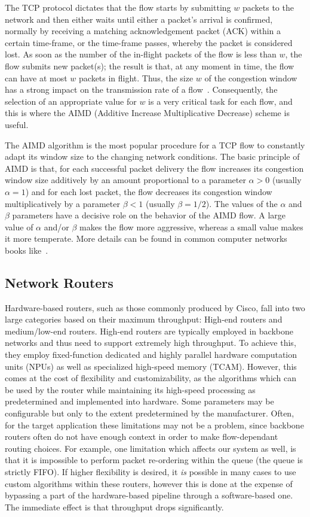 \documentclass[letterpaper,10pt]{llncs}
\begin{document}
The TCP protocol dictates that the flow starts by submitting $w$ packets to
the network and then either waits until either a packet’s arrival is confirmed, 
normally by receiving a matching acknowledgement packet (ACK) within a certain time-frame,
or the time-frame passes, whereby the packet is considered lost.
As soon as the number of the in-flight packets of the flow is less than $w$, the flow submits
new packet(s); the result is that, at any moment in time, the flow can have at most $w$ packets in flight. Thus, the size $w$ of the
congestion window has a strong impact on the transmission rate of a flow~\cite{Ja88}. Consequently, the selection of an appropriate value for $w$
is a very critical task for each flow, and this is where the AIMD (Additive Increase Multiplicative Decrease) scheme is useful. 

The AIMD algorithm
is the most popular procedure for a TCP flow to constantly adapt its window size to the changing network conditions.
The basic principle of AIMD is that, for each successful packet delivery the flow increases its congestion window size additively
by an amount proportional to a parameter $\alpha > 0$ (usually $\alpha = 1$) and for each lost packet, the flow decreases its congestion
window multiplicatively by a parameter $\beta < 1$ (usually $\beta = 1/2$). The values of the $\alpha$ and $\beta$ parameters have a decisive
role on the behavior of the AIMD flow. A large value of $\alpha$ and/or $\beta$ makes the flow more aggressive, whereas a small value
makes it more temperate. More details can be found in common computer networks books like~\cite{Peterson:2007:Networks,Stevens:1994:Vol1}.

 
\subsection{Network Routers}
\label{sec:hw}
Hardware-based routers, such as those commonly produced by Cisco, fall into two large categories based on their maximum throughput: High-end routers and medium/low-end routers.
High-end routers are typically employed in backbone networks and thus need to support extremely high throughput. To achieve this, they employ fixed-function dedicated and highly parallel hardware computation units (NPUs) as well as specialized high-speed memory (TCAM).
However, this comes at the cost of flexibility and customizability, as the algorithms which can be used by the router while maintaining its high-speed processing as predetermined and implemented into hardware. Some parameters may be configurable but only to the extent predetermined by the manufacturer. Often, for the target application these limitations may not be a problem, since backbone routers often do not have enough context in order to make flow-dependant routing choices. For example, one limitation which affects our system as well, is that it is impossible to perform packet re-ordering within the queue (the queue is strictly FIFO).
If higher flexibility is desired, it \emph{is} possible in many cases to use custom algorithms within these routers, however this is done at the expense of bypassing a part of the hardware-based pipeline through a software-based one. The immediate effect is that throughput drops significantly.
\end{document}
